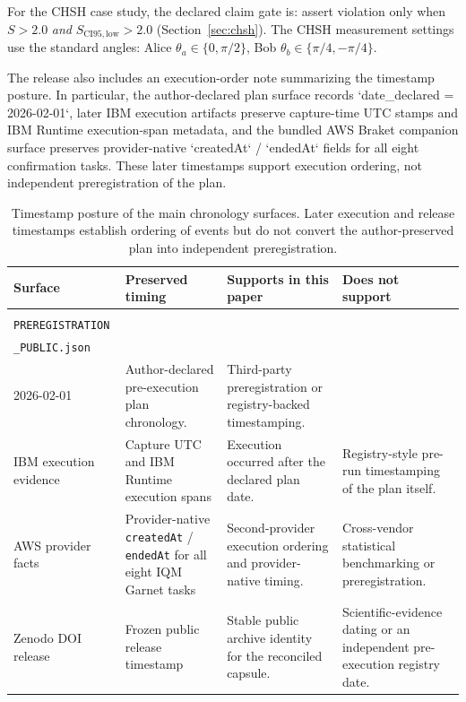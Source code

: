 \documentclass[aps,prxquantum,twocolumn,superscriptaddress,amsmath,amssymb,longbibliography,floatfix]{revtex4-2}
\begin{document}
For the CHSH case study, the declared claim gate is: assert violation only when $S > 2.0$ \emph{and} $S_{\mathrm{CI95,low}} > 2.0$ (Section~\ref{sec:chsh}). The CHSH measurement settings use the standard angles: Alice $\theta_a \in \{0, \pi/2\}$, Bob $\theta_b \in \{\pi/4, -\pi/4\}$.

The release also includes an execution-order note summarizing the timestamp posture. In particular, the author-declared plan surface records `date\_declared = 2026-02-01`, later IBM execution artifacts preserve capture-time UTC stamps and IBM Runtime execution-span metadata, and the bundled AWS Braket companion surface preserves provider-native `createdAt` / `endedAt` fields for all eight confirmation tasks. These later timestamps support execution ordering, not independent preregistration of the plan.

\begin{table}[t]
\caption{Timestamp posture of the main chronology surfaces. Later execution and release timestamps establish ordering of events but do not convert the author-preserved plan into independent preregistration.}
\label{tab:timestamp_posture}
\footnotesize
\begin{ruledtabular}
\begin{tabular}{p{3.0cm}p{3.0cm}p{4.3cm}p{4.3cm}}
Surface & Preserved timing & Supports in this paper & Does not support \\
\hline
\shortstack[l]{\texttt{anc/}\\\texttt{PREREGISTRATION}\\\texttt{\_PUBLIC.json}} & \shortstack[l]{\texttt{date\_declared}\\2026-02-01} & Author-declared pre-execution plan chronology. & Third-party preregistration or registry-backed timestamping. \\
IBM execution evidence & Capture UTC and IBM Runtime execution spans & Execution occurred after the declared plan date. & Registry-style pre-run timestamping of the plan itself. \\
AWS provider facts & Provider-native \texttt{createdAt} / \texttt{endedAt} for all eight IQM Garnet tasks & Second-provider execution ordering and provider-native timing. & Cross-vendor statistical benchmarking or preregistration. \\
Zenodo DOI release & Frozen public release timestamp & Stable public archive identity for the reconciled capsule. & Scientific-evidence dating or an independent pre-execution registry date. \\
\end{tabular}
\end{ruledtabular}
\end{table}
\end{document}
